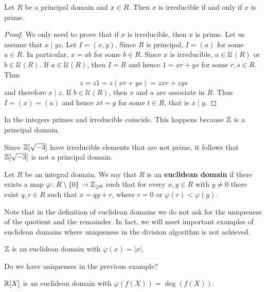 \begin{proposition}
\label{pro:PID:irreducible=prime}
	Let $R$ be a principal domain and $x\in R$. 
	Then $x$ is irreducible if and only if $x$ is prime. 	
\end{proposition}

\begin{proof}
	We only need to prove that if $x$ is irreducible, then $x$ is prime. Let us
	assume that $x\mid yz$. Let $I=(x,y)$. Since $R$ is principal, $I=(a)$ for some $a\in R$. In particular, $x=ab$ for some $b\in R$. Since $x$ is irreducible, $a\in\mathcal{U}(R)$ or
	$b\in\mathcal{U}(R)$. If $a\in\mathcal{U}(R)$, then $I=R$ and hence 
	$1=xr+ys$ for some $r,s\in R$. Thus
	\[
	z=z1=z(xr+ys)=zxr+zys
	\]
	and therefore $x\mid z$. If $b\in\mathcal{U}(R)$, then $x$ and $a$ are associate
	in $R$. Thus $I=(x)=(a)$ and hence $xt=y$ for some $t\in R$, that is $x\mid y$.  
\end{proof}

In the integers primes and irreducible coincide. This happens 
because $\mathbb{Z}$ is a principal domain.

\begin{example}
	Since $\mathbb{Z}[\sqrt{-3}]$ have irreducible elements that are not prime, it follows that
	$\mathbb{Z}[\sqrt{-3}]$ is not a principal domain.
\end{example}

\begin{definition}
	Let $R$ be an integral domain. We say that $R$ is an \textbf{euclidean domain}
	if there exists a map $\varphi\colon R\setminus\{0\}\to\mathbb{Z}_{\geq0}$ such that
	for every $x,y\in R$ with $y\ne 0$ there exist $q,r\in R$ such that 
	$x=qy+r$, where $r=0$ or $\varphi(r)<\varphi(y)$. 
\end{definition}

Note that in the definition of euclidean domains we do not ask for the uniqueness 
of the quotient and the remainder. In fact, 
we will meet important examples of euclidean domains where uniqueness
in the division algorithm is not achieved. 

\begin{example}
	$\mathbb{Z}$ is an euclidean domain with $\varphi(x)=|x|$.
\end{example}

Do we have uniqueness in the previous example? 	

\begin{example}
	$\mathbb{R}[X]$ is an euclidean domain with $\varphi(f(X))=\deg(f(X))$. 	
\end{example}


